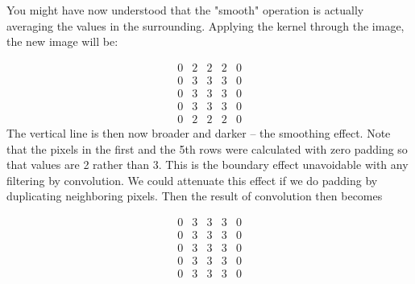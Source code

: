 You might have now understood that the
"smooth" operation is actually
averaging the values in the surrounding. Applying the kernel through
the image, the new image will be: 


\[
 \begin{matrix}
  0 & 2 & 2 & 2 & 0 \\
  0 & 3 & 3 & 3 & 0 \\
  0 & 3 & 3 & 3 & 0 \\
  0 & 3 & 3 & 3 & 0 \\
  0 & 2 & 2 & 2 & 0 
 \end{matrix}
\]
The vertical line is then now broader and darker -- the smoothing
effect. Note that the pixels in the first and the 5th rows were
calculated with zero padding so that values are 2 rather than 3. This
is the boundary effect unavoidable with any filtering by convolution.
We could attenuate this effect if we do padding by duplicating
neighboring pixels. Then the result of convolution then becomes

\[
 \begin{matrix}
  0 & 3 & 3 & 3 & 0 \\
  0 & 3 & 3 & 3 & 0 \\
  0 & 3 & 3 & 3 & 0 \\
  0 & 3 & 3 & 3 & 0 \\
  0 & 3 & 3 & 3 & 0 
 \end{matrix}
\]

